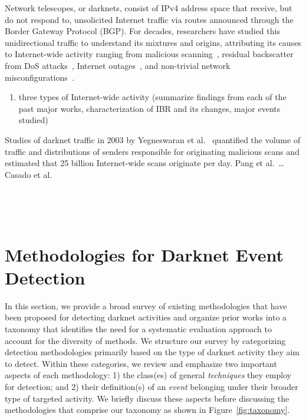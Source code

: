 \documentclass[manuscript,nonacm]{acmart}
\begin{document}
Network telescopes, or darknets, consist of IPv4 address space that receive, but do not respond to, unsolicited Internet traffic via routes announced through the Border Gateway Protocol (BGP).
For decades, researchers have studied this unidirectional traffic to understand its mixtures and origins, attributing its causes to Internet-wide activity ranging from 
malicious scanning~\cite{@@}, residual backscatter from DoS attacks~\cite{@@}, Internet outages~\cite{2011dainotti,2013benson,2015benson,2012dainotti,2021padmanabhan}, and non-trivial network misconfigurations~\cite{@@}.

\begin{enumerate}
    \item three types of Internet-wide activity (summarize findings from each of the past major works, characterization of IBR and its changes, major events studied)
\end{enumerate}

Studies of darknet traffic in 2003 by Yegneswaran et al.~\cite{2004yegneswaran} quantified the volume of traffic and distributions of senders responsible for originating malicious scans 
and estimated that 25 billion Internet-wide scans originate per day.
Pang et al.~\cite{2004pang}\dots
Casado et al.~\cite{2005casado}

~\cite{2004yegneswaran,2004pang}

~\cite{2011dainotti,2013benson,2015benson,2012dainotti}~\cite{2021padmanabhan}


\label{sec:frameworks}
\section{Methodologies for Darknet Event Detection}

In this section, we provide a broad survey of existing methodologies that have been proposed for detecting darknet activities and 
organize prior works into a taxonomy that identifies the need for a systematic evaluation approach to account for the diversity of methods.
We structure our survey by categorizing detection methodologies primarily based on the type of darknet activity they aim to detect. 
Within these categories, we review and emphasize two important aspects of each methodology: 
1) the class(es) of general \textit{techniques} they employ for detection; and 
2) their definition(s) of an \textit{event} belonging under their broader type of targeted activity.
We briefly discuss these aspects before discussing the methodologies that comprise our taxonomy as shown in Figure~\ref{fig:taxonomy}.
\end{document}
